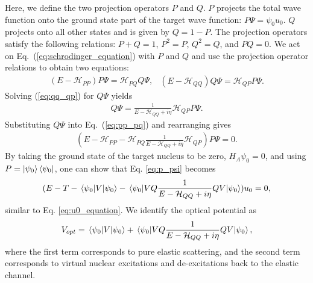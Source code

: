 \documentclass[preprintnumbers,floatfix,aps,prc,preprint,nofootinbib]{revtex4-1}
\begin{document}
Here, we define the two projection operators $P$ and $Q$. $P$ projects the total wave function onto the ground state part of the target wave function: $P \Psi = \psi_0 u_0$. $Q$ projects onto all other states and is given by $Q = 1-P$. The projection operators satisfy the following relations: $P+Q=1$, $P^2 = P$, $Q^2 = Q$, and $P Q = 0$. We act on Eq.~(\ref{eq:schrodinger_equation}) with $P$ and $Q$ and use the projection operator relations to obtain two equations:
%
\begin{subequations}
	\label{eq:intermediate_effective_hamiltonian_equations}
	\begin{eqnarray}
		\label{eq:pp_pq}
		(E - \mathcal{H}_{PP}) P \Psi = \mathcal{H}_{PQ} Q \Psi,
	\end{eqnarray}
	\begin{eqnarray}
		\label{eq:qq_qp}
		(E - \mathcal{H}_{QQ}) Q \Psi = \mathcal{H}_{QP} P \Psi.
	\end{eqnarray}
\end{subequations}
%
Solving (\ref{eq:qq_qp}) for $Q \Psi$ yields
%
\begin{eqnarray}
	\label{eq:q_psi}
	Q \Psi = \frac{1}{E - \mathcal{H}_{QQ} + i \eta} \mathcal{H}_{QP} P \Psi.
\end{eqnarray}
%
Substituting $Q \Psi$ into Eq.~(\ref{eq:pp_pq}) and rearranging gives
%
\begin{eqnarray}
	\label{eq:p_psi}
	(E - \mathcal{H}_{PP} - \mathcal{H}_{PQ} \frac{1}{E - \mathcal{H}_{QQ} + i \eta} \mathcal{H}_{QP}) P \Psi = 0.
\end{eqnarray}
%
By taking the ground state of the target nucleus to be zero, $H_A \psi_0 = 0$,  and using $P = \ket{\psi_0} \bra{\psi_0}$, one can show that Eq. \ref{eq:p_psi} becomes
%
\begin{eqnarray}
	\label{eq:p_psi_optical_potential}
	(E - T - \mel{\psi_0}{V}{\psi_0} - \mel{\psi_0}{V Q \frac{1}{E - \mathcal{H}_{QQ} + i \eta} Q V}{\psi_0}) u_0 = 0,
\end{eqnarray}
%
similar to Eq. \ref{eq:u0_equation}. We identify the optical potential as
%
\begin{eqnarray}
	\label{eq:optical_potential_projection}
	V_{opt} = \mel{\psi_0}{V}{\psi_0} + \mel{\psi_0}{V Q \frac{1}{E - \mathcal{H}_{QQ} + i \eta} Q V}{\psi_0},
\end{eqnarray}
% 
where the first term corresponds to pure elastic scattering, and the second term corresponds to virtual nuclear excitations and de-excitations back to the elastic channel.
\end{document}
